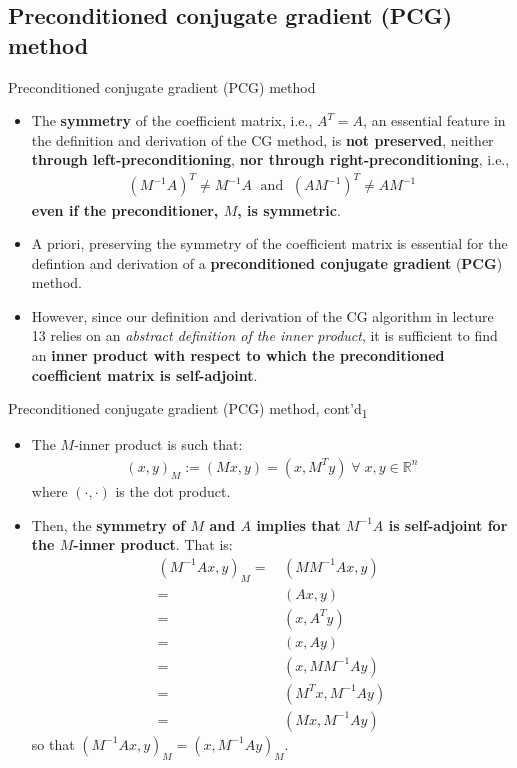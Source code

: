 \documentclass[t,usepdftitle=false]{beamer}
\begin{document}
\subsection{Preconditioned conjugate gradient (PCG) method}
\begin{frame}{Preconditioned conjugate gradient (PCG) method}
\begin{itemize}
\item The \textbf{symmetry} of the coefficient matrix, i.e., $A^T=A$, an essential feature in the definition and derivation of the CG method, is \textbf{not preserved}, neither \textbf{through left-preconditioning}, \textbf{nor through right-preconditioning}, i.e.,
\begin{align*}
(M^{-1}A)^T\neq M^{-1}A
\;\text{ and }\;
(AM^{-1})^T\neq AM^{-1}
\end{align*}
\textbf{even if the preconditioner, $M$, is symmetric}.
\item A priori, preserving the symmetry of the coefficient matrix is essential for the defintion and derivation of a \textbf{preconditioned conjugate gradient} (\textbf{PCG}) method.
\item[] However, since our definition and derivation of the CG algorithm in lecture 13 relies on an \textit{abstract definition of the inner product}, it is sufficient to find an \textbf{inner product with respect to which the preconditioned coefficient matrix is self-adjoint}.
\end{itemize}
\end{frame}

\begin{frame}{Preconditioned conjugate gradient (PCG) method, cont'd\textsubscript{1}}
\begin{itemize}
\item The $M$-inner product is such that:
\begin{align*}
(x,y)_M:=(Mx,y)=(x,M^Ty)
\;\forall\;x,y\in\mathbb{R}^n
\end{align*}
where $(\cdot,\cdot)$ is the dot product.
\item[] Then, the \textbf{symmetry of $M$ and $A$ implies that $M^{-1}A$ is self-adjoint for the $M$-inner product}.
That is:
\begin{align*}
(M^{-1}Ax,y)_M
=&\,(MM^{-1}Ax,y)\\
=&\,(Ax,y)\\
=&\,(x,A^Ty)\\
=&\,(x,Ay)\\
=&\,(x,MM^{-1}Ay)\\
=&\,(M ^Tx,M^{-1}Ay)\\
=&\,(Mx,M^{-1}Ay)
\end{align*}
so that $(M^{-1}Ax,y)_M=(x,M^{-1}Ay)_M$.
\end{itemize}
\end{frame}
\end{document}
